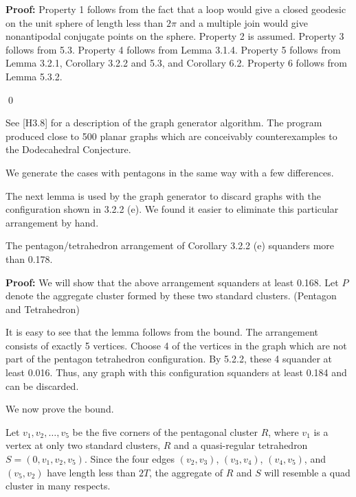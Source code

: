 \bigskip

{\bf Proof:} Property 1 follows from the fact that a loop would give a closed geodesic on the unit sphere of length less than $2\pi$ and a multiple join would give nonantipodal conjugate points on the sphere. \newline 
Property 2 is assumed.  \newline
Property 3 follows from 5.3. \newline 
Property 4 follows from Lemma 3.1.4. \newline 
Property 5 follows from Lemma 3.2.1, Corollary 3.2.2 and 5.3, and Corollary 6.2.\newline 
Property 6 follows from Lemma 5.3.2. \newline 

\qed


See [H3.8] for a description of the graph generator algorithm.  The program produced close to 500 planar graphs which are conceivably counterexamples to the Dodecahedral Conjecture.

We generate the cases with pentagons in the same way with a few differences.

The next lemma is used by the graph generator to discard graphs with 
the configuration shown in 3.2.2 (e).  We found it easier to eliminate this
particular arrangement by hand.

 The  pentagon/tetrahedron arrangement of Corollary 3.2.2 (e) squanders more than 0.178. \endproclaim

{\bf Proof:} We will show that the above arrangement squanders at least
0.168.  Let $P$ denote the aggregate cluster formed by these two standard
clusters. (Pentagon and Tetrahedron)

It is easy to see that the lemma follows from the bound.  The arrangement consists of exactly 5 vertices.  Choose 4 of the vertices in the graph which are not part of the pentagon tetrahedron configuration.  By 5.2.2, these 4 squander at least 0.016.  Thus, any graph with this configuration squanders at least 0.184 and can be discarded.

We now prove the bound.  

Let $v_1,v_2,\ldots,v_5$
be the five corners of the pentagonal cluster $R$, where $v_1$ is a
vertex at only two standard clusters, $R$ and a quasi-regular tetrahedron
$S = (0,v_1,v_2,v_5)$.   Since the four edges $(v_2,v_3)$, $(v_3,v_4)$,
$(v_4,v_5)$, and $(v_5,v_2)$ have length less than $2T$, the
aggregate of 
$R$ and $S$ will resemble a quad cluster in many respects.

